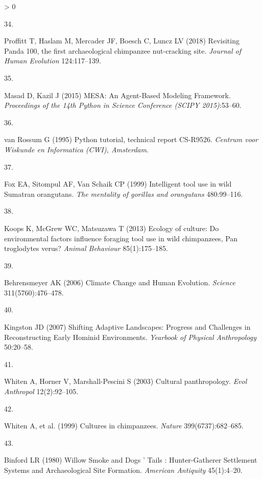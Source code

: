 \documentclass[9pt,twocolumn,twoside,]{pnas-new}
\newlength{\csllabelwidth}
\newlength{\cslhangindent}
\newenvironment{CSLReferences}[3] %
 {%
  \setlength{\parindent}{0pt}
  \ifodd #1 \everypar{\setlength{\hangindent}{\cslhangindent}}\ignorespaces\fi
  \ifnum #2 > 0
  \setlength{\parskip}{#2\baselineskip}
  \fi
 }%
 {}
\newcommand{\CSLLeftMargin}[1]{\parbox[t]{\csllabelwidth}{#1}}
\newcommand{\CSLRightInline}[1]{\parbox[t]{\linewidth - \csllabelwidth}{#1}}
\begin{document}
\begin{CSLReferences}{0}{0}
\leavevmode\hypertarget{ref-proffittRevisitingPanda1002018}{}%
\CSLLeftMargin{34. }
\CSLRightInline{Proffitt T, Haslam M, Mercader JF, Boesch C, Luncz LV
(2018) Revisiting {Panda} 100, the first archaeological chimpanzee
nut-cracking site. \emph{Journal of Human Evolution} 124:117--139.}

\leavevmode\hypertarget{ref-masadMESAAgentBasedModeling2015}{}%
\CSLLeftMargin{35. }
\CSLRightInline{Masad D, Kazil J (2015) {MESA}: {An Agent}-{Based
Modeling Framework}. \emph{Proceedings of the 14th Python in Science
Conference (SCIPY 2015)}:53--60.}

\leavevmode\hypertarget{ref-rossum1995python}{}%
\CSLLeftMargin{36. }
\CSLRightInline{van Rossum G (1995) Python tutorial, technical report
{CS}-{R9526}. \emph{Centrum voor Wiskunde en Informatica (CWI),
Amsterdam}.}

\leavevmode\hypertarget{ref-foxIntelligentToolUse1999}{}%
\CSLLeftMargin{37. }
\CSLRightInline{Fox EA, Sitompul AF, Van Schaik CP (1999) Intelligent
tool use in wild {Sumatran} orangutans. \emph{The mentality of gorillas
and orangutans} 480:99--116.}

\leavevmode\hypertarget{ref-koopsEcologyCultureEnvironmental2013}{}%
\CSLLeftMargin{38. }
\CSLRightInline{Koops K, McGrew WC, Matsuzawa T (2013) Ecology of
culture: Do environmental factors influence foraging tool use in wild
chimpanzees, {Pan} troglodytes verus? \emph{Animal Behaviour}
85(1):175--185.}

\leavevmode\hypertarget{ref-behrensmeyerClimateChangeHuman2006}{}%
\CSLLeftMargin{39. }
\CSLRightInline{Behrensmeyer AK (2006) Climate {Change} and {Human
Evolution}. \emph{Science} 311(5760):476--478.}

\leavevmode\hypertarget{ref-kingstonShiftingAdaptiveLandscapes2007}{}%
\CSLLeftMargin{40. }
\CSLRightInline{Kingston JD (2007) Shifting {Adaptive Landscapes}:
{Progress} and {Challenges} in {Reconstructing Early Hominid
Environments}. \emph{Yearbook of Physical Anthropology} 50:20--58.}

\leavevmode\hypertarget{ref-whitenCulturalPanthropology2003}{}%
\CSLLeftMargin{41. }
\CSLRightInline{Whiten A, Horner V, Marshall-Pescini S (2003) Cultural
panthropology. \emph{Evol Anthropol} 12(2):92--105.}

\leavevmode\hypertarget{ref-whitenCulturesChimpanzees1999}{}%
\CSLLeftMargin{42. }
\CSLRightInline{Whiten A, et al. (1999) Cultures in chimpanzees.
\emph{Nature} 399(6737):682--685.}

\leavevmode\hypertarget{ref-binfordWillowSmokeDogs1980}{}%
\CSLLeftMargin{43. }
\CSLRightInline{Binford LR (1980) Willow {Smoke} and {Dogs} ' {Tails} :
{Hunter}-{Gatherer Settlement Systems} and {Archaeological Site
Formation}. \emph{American Antiquity} 45(1):4--20.}


\end{CSLReferences}
\end{document}
